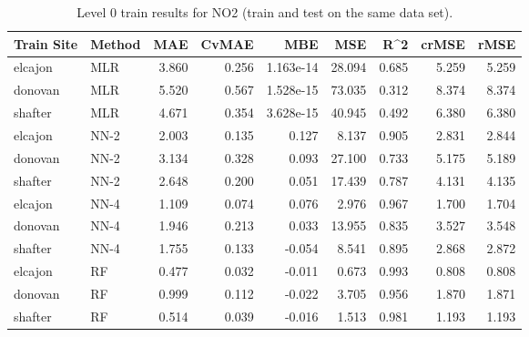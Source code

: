 \begin{table}[h]
\begin{tabular}{llrrrrrrr}
\toprule
 Train Site & Method &   MAE &  CvMAE &       MBE &     MSE &   R\textasciicircum2 &  crMSE &   rMSE \\
\midrule
elcajon & MLR & 3.860 & 0.256 & 1.163e-14 & 28.094 & 0.685 & 5.259 & 5.259\\
donovan & MLR & 5.520 & 0.567 & 1.528e-15 & 73.035 & 0.312 & 8.374 & 8.374\\
shafter & MLR & 4.671 & 0.354 & 3.628e-15 & 40.945 & 0.492 & 6.380 & 6.380\\
elcajon & NN-2 & 2.003 & 0.135 & 0.127 & 8.137 & 0.905 & 2.831 & 2.844\\
donovan & NN-2 & 3.134 & 0.328 & 0.093 & 27.100 & 0.733 & 5.175 & 5.189\\
shafter & NN-2 & 2.648 & 0.200 & 0.051 & 17.439 & 0.787 & 4.131 & 4.135\\
elcajon & NN-4 & 1.109 & 0.074 & 0.076 & 2.976 & 0.967 & 1.700 & 1.704\\
donovan & NN-4 & 1.946 & 0.213 & 0.033 & 13.955 & 0.835 & 3.527 & 3.548\\
shafter & NN-4 & 1.755 & 0.133 & -0.054 & 8.541 & 0.895 & 2.868 & 2.872\\
elcajon & RF & 0.477 & 0.032 & -0.011 & 0.673 & 0.993 & 0.808 & 0.808\\
donovan & RF & 0.999 & 0.112 & -0.022 & 3.705 & 0.956 & 1.870 & 1.871\\
shafter & RF & 0.514 & 0.039 & -0.016 & 1.513 & 0.981 & 1.193 & 1.193\\
\bottomrule
\end{tabular}
\caption{Level 0 train results for NO2 (train and test on the same data set).}
\end{table}
